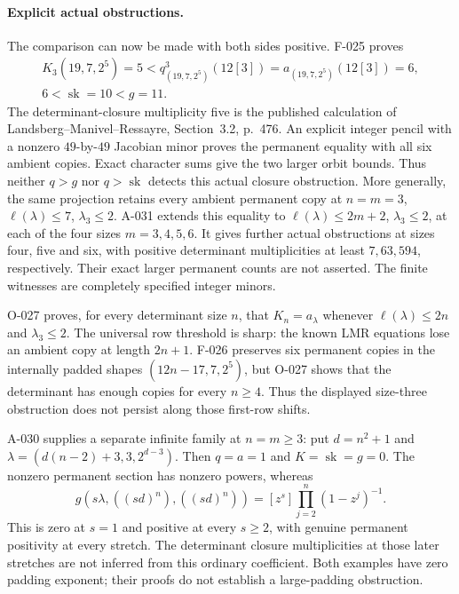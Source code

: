 \paragraph{Explicit actual obstructions.}
The comparison can now be made with both sides positive. F-025 proves
\[
 \begin{gathered}
 K_3(19,7,2^5)=5
 <q^3_{(19,7,2^5)}(12[3])=a_{(19,7,2^5)}(12[3])=6,\\
 6<\operatorname{sk}=10<g=11.
 \end{gathered}
\]
The determinant-closure multiplicity five is the published calculation
of Landsberg--Manivel--Ressayre, Section~3.2, p.~476. An explicit
integer pencil with a nonzero \(49\)-by-\(49\) Jacobian minor proves
the permanent equality with all six ambient copies. Exact character
sums give the two larger orbit bounds. Thus neither \(q>g\) nor
\(q>\operatorname{sk}\) detects this actual closure obstruction.
More generally, the same projection retains every ambient permanent
copy at \(n=m=3\), \(\ell(\lambda)\leq7\), \(\lambda_3\leq2\).
A-031 extends this equality to \(\ell(\lambda)\leq2m+2\),
\(\lambda_3\leq2\), at each of the four sizes \(m=3,4,5,6\).
It gives further actual obstructions at sizes four, five and six,
with positive determinant multiplicities at least \(7,63,594\),
respectively. Their exact larger permanent counts are not asserted.
The finite witnesses are completely specified integer minors.

O-027 proves, for every determinant size \(n\), that
\(K_n=a_\lambda\) whenever \(\ell(\lambda)\leq2n\) and
\(\lambda_3\leq2\). The universal row threshold is sharp:
the known LMR equations lose an ambient copy at length \(2n+1\).
F-026 preserves six permanent copies in the internally padded shapes
\((12n-17,7,2^5)\), but O-027 shows that the determinant has
enough copies for every \(n\geq4\). Thus the displayed size-three
obstruction does not persist along those first-row shifts.

A-030 supplies a separate infinite family at \(n=m\geq3\): put
\(d=n^2+1\) and
\(\lambda=(d(n-2)+3,3,2^{d-3})\). Then \(q=a=1\) and
\(K=\operatorname{sk}=g=0\). The nonzero permanent section has
nonzero powers, whereas
\[
 g(s\lambda,((sd)^n),((sd)^n))
             =[z^s]\prod_{j=2}^n(1-z^j)^{-1}.
\]
This is zero at \(s=1\) and positive at every \(s\geq2\),
with genuine permanent positivity at every stretch. The determinant
closure multiplicities at those later stretches are not inferred
from this ordinary coefficient. Both examples have zero padding
exponent; their proofs do not establish a large-padding obstruction.

